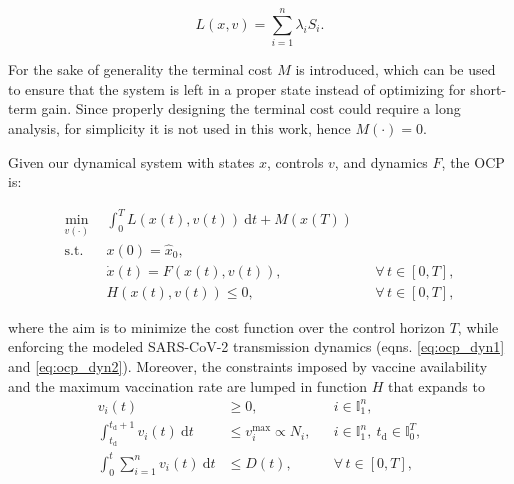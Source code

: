 \begin{equation*}
    L(x,v) = \sum_{i=1}^n \lambda_i S_i.
\end{equation*}

For the sake of generality the terminal cost $M$ is introduced, which can be used to ensure that the system is left in a proper state instead of optimizing for short-term gain. Since properly designing the terminal cost could require a long analysis, for simplicity it is not used in this work, hence $M(\cdot) = 0$.

Given our dynamical system with states $x$, controls $v$, and dynamics $F$, the OCP is:

\begin{subequations}
    \label{eq:ocp}
    \begin{align}
        \min_{v(\cdot)} \ \ & \int_{0}^{T} L(x(t),v(t)) \ \mathrm{d}t + M(x(T)) \\ \label{eq:ocp_dyn1}
        \mathrm{s.t.} \ \ & x(0) = \hat x_0, \\ \label{eq:ocp_dyn2}
        &\dot x(t) = F(x(t),v(t)), && \forall \, t\in[0,T], \\ 
        &H(x(t),v(t)) \leq 0, && \forall \, t\in[0,T],
    \end{align}
\end{subequations}

where the aim is to minimize the cost function over the control horizon $T$, while enforcing the modeled SARS-CoV-2 transmission dynamics (eqns. \eqref{eq:ocp_dyn1} and \eqref{eq:ocp_dyn2}). Moreover, the constraints imposed by vaccine availability and the maximum vaccination rate are lumped in function $H$ that expands to
\begin{subequations}
    \begin{align}
        v_i(t) &\geq 0, && i\in\mathbb{I}_1^n, \label{eq:constr_vacc_met} \\
        \int_{t_\mathrm{d}}^{t_\mathrm{d}+1} v_i(t) \ \mathrm{d}t &\leq v_i^\mathrm{max} \propto N_i, && i\in\mathbb{I}_1^n,\ t_\mathrm{d} \in \mathbb{I}_0^T,  \label{eq:constr_day_met} \\
        \int_{0}^{t} \sum_{i=1}^n v_i(t) \ \mathrm{d}t &\leq D(t), && \forall \, t\in[0,T], \label{eq:constr_week_met}
    \end{align}
\end{subequations}

